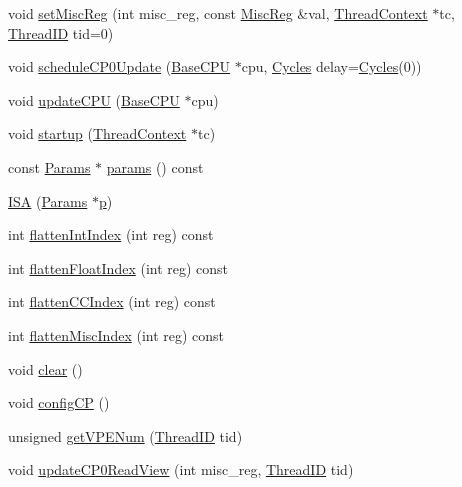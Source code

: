 \begin{DoxyCompactItemize}
void \hyperlink{classMipsISA_1_1ISA_ab85b054f14d72781b7f540270867e2df}{setMiscReg} (int misc\_\-reg, const \hyperlink{namespaceMipsISA_aa16539aa6584fd12f7d6fa868f75b4de}{MiscReg} \&val, \hyperlink{classThreadContext}{ThreadContext} $\ast$tc, \hyperlink{base_2types_8hh_ab39b1a4f9dad884694c7a74ed69e6a6b}{ThreadID} tid=0)
\item 
void \hyperlink{classMipsISA_1_1ISA_a85221cc4f7fe8618574a72b6410318f4}{scheduleCP0Update} (\hyperlink{classBaseCPU}{BaseCPU} $\ast$cpu, \hyperlink{classm5_1_1params_1_1Cycles}{Cycles} delay=\hyperlink{classm5_1_1params_1_1Cycles}{Cycles}(0))
\item 
void \hyperlink{classMipsISA_1_1ISA_a872038d84b4cde793f5f2f7b75df3293}{updateCPU} (\hyperlink{classBaseCPU}{BaseCPU} $\ast$cpu)
\item 
void \hyperlink{classMipsISA_1_1ISA_a769e733729615c529fdb54f538f11dba}{startup} (\hyperlink{classThreadContext}{ThreadContext} $\ast$tc)
\item 
const \hyperlink{classMipsISA_1_1ISA_a356644158667486a7a343f11512e4dc7}{Params} $\ast$ \hyperlink{classMipsISA_1_1ISA_a79943ccd051cbee11887e08c12997892}{params} () const 
\item 
\hyperlink{classMipsISA_1_1ISA_ae9132e021b3f3b20c917fc328a056bbd}{ISA} (\hyperlink{classMipsISA_1_1ISA_a356644158667486a7a343f11512e4dc7}{Params} $\ast$\hyperlink{namespaceMipsISA_a37d3f683959086eac7bcf24a002a9fb8}{p})
\item 
int \hyperlink{classMipsISA_1_1ISA_aece4b88ffcab608652e8e9f0fbe643d4}{flattenIntIndex} (int reg) const 
\item 
int \hyperlink{classMipsISA_1_1ISA_a85addcd4f57c5a0ffa81805dcad1eeb7}{flattenFloatIndex} (int reg) const 
\item 
int \hyperlink{classMipsISA_1_1ISA_a7a5d7476bd10e5af09e6e753d1fca087}{flattenCCIndex} (int reg) const 
\item 
int \hyperlink{classMipsISA_1_1ISA_a8997760aa4425793911f57440a4dd8ae}{flattenMiscIndex} (int reg) const 
\item 
void \hyperlink{classMipsISA_1_1ISA_ac8bb3912a3ce86b15842e79d0b421204}{clear} ()
\item 
void \hyperlink{classMipsISA_1_1ISA_af9cb72b444a0f6c58cb2ca90573144eb}{configCP} ()
\item 
unsigned \hyperlink{classMipsISA_1_1ISA_ac14017b7c7cddd04d2e028cde54f6165}{getVPENum} (\hyperlink{base_2types_8hh_ab39b1a4f9dad884694c7a74ed69e6a6b}{ThreadID} tid)
\item 
void \hyperlink{classMipsISA_1_1ISA_ab5936dc40fc4dbeac3066d5d7cffeb11}{updateCP0ReadView} (int misc\_\-reg, \hyperlink{base_2types_8hh_ab39b1a4f9dad884694c7a74ed69e6a6b}{ThreadID} tid)

\end{DoxyCompactItemize}
